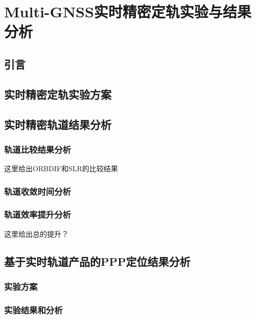 
\chapter{Multi-GNSS实时精密定轨实验与结果分析}

\section{引言}

\section{实时精密定轨实验方案}

\section{实时精密轨道结果分析}

\subsection{轨道比较结果分析}
这里给出ORBDIF和SLR的比较结果

\subsection{轨道收敛时间分析}

\subsection{轨道效率提升分析}
这里给出总的提升？

\section{基于实时轨道产品的PPP定位结果分析}

\subsection{实验方案}

\subsection{实验结果和分析}